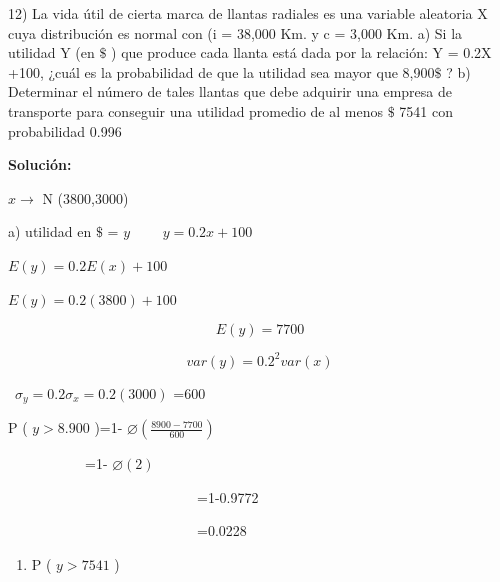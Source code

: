 \documentclass[10pt,a4paper]{article}
\begin{document}
\begin{flushleft}
	
	12) La vida útil de cierta marca de llantas radiales es una variable aleatoria X cuya distribución es normal con (i = 38,000 Km. y c = 3,000 Km. a) Si la utilidad Y (en $\$$ ) que produce cada llanta está dada por la relación: Y = 0.2X +100, ¿cuál es la probabilidad de que la utilidad sea mayor que 8,900$\$$ ? b) Determinar el número de tales llantas que debe adquirir una empresa de transporte para conseguir una utilidad promedio de al menos $\$$ 7541 con probabilidad 0.996
	
	\textbf{Solución:}\par
	
	
	\vspace{\baselineskip}
	\begin{multicols}{2}
		\( x \rightarrow  \) N (3800,3000)\par
		
		a) utilidad en  \( \$ \) = \(  y \) \  \ \ \   \( y=0.2x+100 \) \ \ \ \ \  \par
		
		\( E \left( y \right) =0.2E \left( x \right) +100 \) \ \ \ \ \  \par
		
		\( E \left( y \right) =0.2 \left( 3800 \right) +100 \) \ \ \ \ \  \par
		
		\[  \]  \[ E \left( y \right) =7700 \] \par
		
		\[  \]  \[ var \left( y \right) =0.2^{2}var \left( x \right)  \] \par
		
		\   \(  \sigma _{y}=0.2 \sigma _{x}=0.2 \left( 3000 \right)  \) =600\par
		
		P ( \( y>8.900 \) )=1- \(  \varnothing  \left( \frac{8900-7700}{600} \right)  \) \par
		
		\ \ \ \ \ \ \ \ \ \ \  =1- \(  \varnothing  \left( 2 \right)  \) \par
		
		\ \ \ \ \ \ \ \ \ \ \ \ \ \ \ \ \ \ \ \ \ \ \ \ \ \ \  =1-0.9772\par
		
		\ \ \ \ \ \ \ \ \ \ \ \ \ \ \ \ \ \ \ \ \ \ \ \ \ \ \  =0.0228\par
		
		
		\vspace{\baselineskip}\begin{enumerate}
			\item P ( \( y>7541 \) )
		\end{enumerate}\par
		

\end{multicols}
\end{flushleft}
\end{document}
